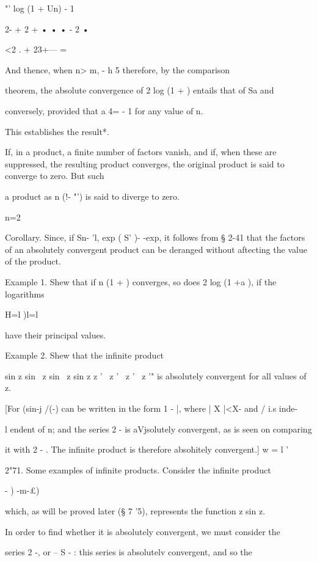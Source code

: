   "' log (1 + Un) - 1



2- + 2 + • • • - 2 •



<2 . + 23+--- =

And thence, when n> m, - h 5 therefore, by the comparison

theorem, the absolute convergence of 2 log (1 + ) entails that of Sa
and

conversely, provided that a 4= - 1 for any value of n.

This establishes the result*.

If, in a product, a finite number of factors vanish, and if, when
these are suppressed, the resulting product converges, the original
product is said to converge to zero. But such

a product as n (!- "') is said to diverge to zero.

n=2

Corollary. Since, if Sn- 'l, exp ( S' )- -exp, it follows from § 2-41
that the factors of an absolutely convergent product can be deranged
without aftecting the value of the product.

Example 1. Shew that if n (1 + ) converges, so does 2 log (1 +a ), if
the logarithms

H=l )l=l

have their principal values.

Example 2. Shew that the infinite product

sin z sin \ z sin \ z sin z z ' \ z ' \ z ' \ z '" is absolutely
convergent for all values of z.

[For (sin-j /(-) can be written in the form 1 - |, where | X |<X- and
/ i.s inde-

l endent of n; and the series 2 - is aVjsolutely convergent, as is
seen on comparing

it with 2 - . The infinite product is therefore absohitely
convergent.] w = l '

2"71. Some examples of infinite products. Consider the infinite
product



  - ) -m-£)



which, as will be proved later (§ 7 '5), represents the function z sin
z.

In order to find whether it is absolutely convergent, we must consider
the

series 2 -, or -- S - : this series is absolutelv convergent, and so
the


